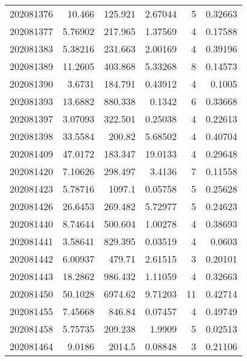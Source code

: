 \begin{tabular}{rrrrrr}
 202081376 &         10.466   &      125.921  &            2.67044 &           5 & 0.32663 \\
 202081377 &          5.76902 &      217.965  &            1.37569 &           4 & 0.17588 \\
 202081383 &          5.38216 &      231.663  &            2.00169 &           4 & 0.39196 \\
 202081389 &         11.2605  &      403.868  &            5.33268 &           8 & 0.14573 \\
 202081390 &          3.6731  &      184.791  &            0.43912 &           4 & 0.1005  \\
 202081393 &         13.6882  &      880.338  &            0.1342  &           6 & 0.33668 \\
 202081397 &          3.07093 &      322.501  &            0.25038 &           4 & 0.22613 \\
 202081398 &         33.5584  &      200.82   &            5.68502 &           4 & 0.40704 \\
 202081409 &         47.0172  &      183.347  &           19.0133  &           4 & 0.29648 \\
 202081420 &          7.10626 &      298.497  &            3.4136  &           7 & 0.11558 \\
 202081423 &          5.78716 &     1097.1    &            0.05758 &           5 & 0.25628 \\
 202081426 &         26.6453  &      269.482  &            5.72977 &           5 & 0.24623 \\
 202081440 &          8.74644 &      500.604  &            1.00278 &           4 & 0.38693 \\
 202081441 &          3.58641 &      829.395  &            0.03519 &           4 & 0.0603  \\
 202081442 &          6.00937 &      479.71   &            2.61515 &           3 & 0.20101 \\
 202081443 &         18.2862  &      986.432  &            1.11059 &           4 & 0.32663 \\
 202081450 &         50.1028  &     6974.62   &            9.71203 &          11 & 0.42714 \\
 202081455 &          7.45668 &      846.84   &            0.07457 &           4 & 0.49749 \\
 202081458 &          5.75735 &      209.238  &            1.9909  &           5 & 0.02513 \\
 202081464 &          9.0186  &     2014.5    &            0.08848 &           3 & 0.21106 \\

\end{tabular}
